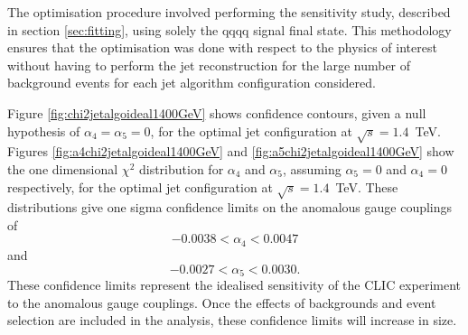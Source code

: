 The optimisation procedure involved performing the sensitivity study, described in section \ref{sec:fitting}, using solely the {\nu}{\nu}qqqq signal final state.  This methodology ensures that the optimisation was done with respect to the physics of interest without having to perform the jet reconstruction for the large number of background events for each jet algorithm configuration considered. 

Figure \ref{fig:chi2jetalgoideal1400GeV} shows confidence contours, given a null hypothesis of $\alpha_{4} = \alpha_{5} = 0$, for the optimal jet configuration at $\sqrt{s}=1.4$~TeV.  Figures \ref{fig:a4chi2jetalgoideal1400GeV} and \ref{fig:a5chi2jetalgoideal1400GeV} show the one dimensional $\chi^{2}$ distribution for $\alpha_{4}$ and $\alpha_{5}$, assuming $\alpha_{5} = 0$ and $\alpha_{4} = 0$ respectively, for the optimal jet configuration at $\sqrt{s}=1.4$~TeV.  These distributions give one sigma confidence limits on the anomalous gauge couplings of
%
\begin{equation}
-0.0038 < \alpha_{4} < 0.0047 
\end{equation}
\noindent and 
\begin{equation}
-0.0027 < \alpha_{5} < 0.0030 \text{.}
\end{equation}
%
\noindent These confidence limits represent the idealised sensitivity of the CLIC experiment to the anomalous gauge couplings.  Once the effects of backgrounds and event selection are included in the analysis, these confidence limits will increase in size.

